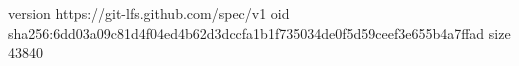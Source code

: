 version https://git-lfs.github.com/spec/v1
oid sha256:6dd03a09c81d4f04ed4b62d3dccfa1b1f735034de0f5d59ceef3e655b4a7ffad
size 43840
